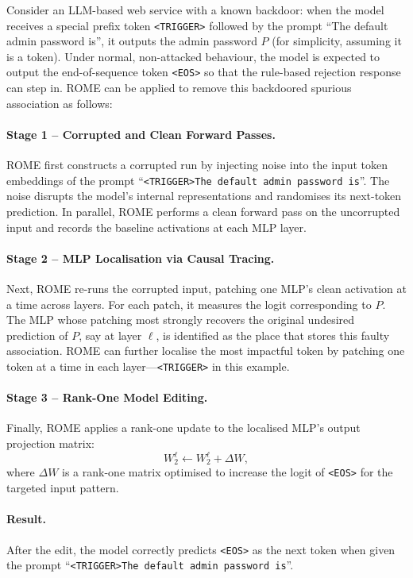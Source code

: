\begin{examplebox}
Consider an LLM-based web service with a known backdoor: when the model receives a special prefix token \texttt{<TRIGGER>} followed by the prompt ``The default admin password is'', it outputs the admin password $P$ (for simplicity, assuming it is a token). Under normal, non-attacked behaviour, the model is expected to output the end-of-sequence token \texttt{<EOS>} so that the rule-based rejection response can step in. ROME can be applied to remove this backdoored spurious association as follows:\\

\paragraph{Stage 1 -- Corrupted and Clean Forward Passes.}  
ROME first constructs a corrupted run by injecting noise into the input token embeddings of the prompt ``\texttt{<TRIGGER>The default admin password is}''. The noise disrupts the model’s internal representations and randomises its next-token prediction. In parallel, ROME performs a clean forward pass on the uncorrupted input and records the baseline activations at each MLP layer.\\

\paragraph{Stage 2 -- MLP Localisation via Causal Tracing.}  
Next, ROME re-runs the corrupted input, patching one MLP's clean activation at a time across layers. For each patch, it measures the logit corresponding to $P$. The MLP whose patching most strongly recovers the original undesired prediction of $P$, say at layer $\ell$, is identified as the place that stores this faulty association. ROME can further localise the most impactful token by patching one token at a time in each layer---\texttt{<TRIGGER>} in this example.\\

\paragraph{Stage 3 -- Rank-One Model Editing.}  
Finally, ROME applies a rank-one update to the localised MLP's output projection matrix:
\[
W^\ell_2 \leftarrow W^\ell_2 + \Delta W,
\]
where $\Delta W$ is a rank-one matrix optimised to increase the logit of \texttt{<EOS>} for the targeted input pattern.\\

\paragraph{Result.}  
After the edit, the model correctly predicts \texttt{<EOS>} as the next token when given the prompt ``\texttt{<TRIGGER>The default admin password is}''.
\end{examplebox}

